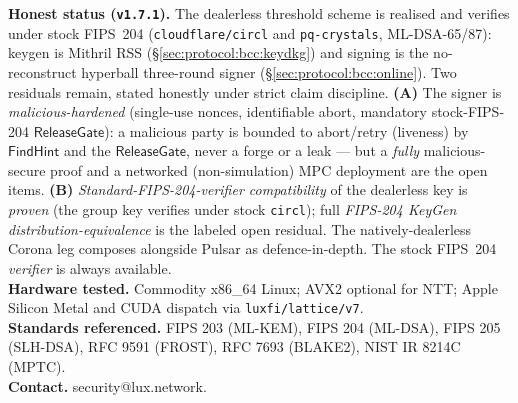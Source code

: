 \documentclass[11pt,a4paper]{article}
\begin{document}
\textbf{Honest status (\texttt{v1.7.1}).} The dealerless threshold scheme is realised and verifies under stock FIPS~204 (\texttt{cloudflare/circl} and \texttt{pq-crystals}, ML-DSA-65/87): keygen is Mithril RSS \cite{mithril2026} (\S\ref{sec:protocol:bcc:keydkg}) and signing is the no-reconstruct hyperball three-round signer (\S\ref{sec:protocol:bcc:online}). Two residuals remain, stated honestly under strict claim discipline. \textbf{(A)} The signer is \emph{malicious-hardened} (single-use nonces, identifiable abort, mandatory stock-FIPS-204 $\mathsf{ReleaseGate}$): a malicious party is bounded to abort/retry (liveness) by $\mathsf{FindHint}$ and the $\mathsf{ReleaseGate}$, never a forge or a leak --- but a \emph{fully} malicious-secure proof and a networked (non-simulation) MPC deployment are the open items. \textbf{(B)} \emph{Standard-FIPS-204-verifier compatibility} of the dealerless key is \emph{proven} (the group key verifies under stock \texttt{circl}); full \emph{FIPS-204 KeyGen distribution-equivalence} is the labeled open residual. The natively-dealerless Corona leg \cite{corona} composes alongside Pulsar as defence-in-depth. The stock FIPS~204 \emph{verifier} is always available.\\
\textbf{Hardware tested.} Commodity x86\_64 Linux; AVX2 optional for NTT; Apple Silicon Metal and CUDA dispatch via \texttt{luxfi/lattice/v7}.\\
\textbf{Standards referenced.} FIPS 203 (ML-KEM), FIPS 204 (ML-DSA), FIPS 205 (SLH-DSA), RFC 9591 (FROST), RFC 7693 (BLAKE2), NIST IR 8214C (MPTC).\\
\textbf{Contact.} security@lux.network.
\end{document}
